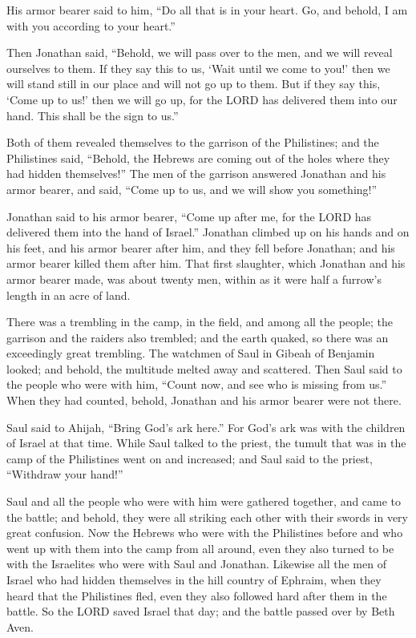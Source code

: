 \myverse{}His armor bearer said to him, “Do all that is in your heart. Go,
and behold, I am with you according to your heart.”

\myverse{}Then Jonathan said, “Behold, we will pass over to the men, and
we will reveal ourselves to them.
\myverse{}If they say this to us, ‘Wait until we come to you!’ then we will stand still
in our place and will not go up to them.
\myverse{}But if they say this, ‘Come up to us!’ then we will go up, for the LORD has
delivered them into our hand. This shall be the sign to us.”

\myverse{}Both of them revealed themselves to the garrison of the Philistines;
and the Philistines said, “Behold, the Hebrews are coming out of the holes where they had hidden themselves!”
\myverse{}The men of the garrison answered Jonathan and his armor bearer, and said,
“Come up to us, and we will show you something!”

Jonathan said to his armor bearer, “Come up after me, for the LORD has delivered them into
the hand of Israel.”
\myverse{}Jonathan climbed up on his hands and on his feet, and his armor bearer after
him, and they fell before Jonathan; and his armor bearer killed them after him.
\myverse{}That first slaughter, which Jonathan and his armor bearer made, was about
twenty men, within as it were half a furrow’s length in an acre of land.

\myverse{}There was a trembling in the camp, in the field, and among all
the people; the garrison and the raiders also trembled; and the earth quaked, so there was an exceedingly
great trembling.
\myverse{}The watchmen of Saul in Gibeah of Benjamin looked; and behold, the multitude
melted away and scattered.
\myverse{}Then Saul said to the people who were with him, “Count now, and see who is
missing from us.” When they had counted, behold, Jonathan and his armor bearer were not there.

\myverse{}Saul said to Ahijah, “Bring God’s ark here.” For God’s ark was
with the children of Israel at that time.
\myverse{}While Saul talked to the priest, the tumult that was in the camp of the Philistines
went on and increased; and Saul said to the priest, “Withdraw your hand!”

\myverse{}Saul and all the people who were with him were gathered together,
and came to the battle; and behold, they were all striking each other with their swords in very great
confusion.
\myverse{}Now the Hebrews who were with the Philistines before and who went up with
them into the camp from all around, even they also turned to be with the Israelites who were with Saul
and Jonathan.
\myverse{}Likewise all the men of Israel who had hidden themselves in the hill country
of Ephraim, when they heard that the Philistines fled, even they also followed hard after them in the
battle.
\myverse{}So the LORD saved Israel that day; and the battle passed over by Beth Aven.

